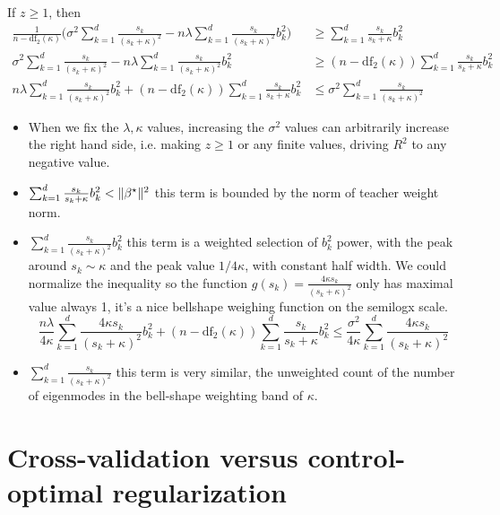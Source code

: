 If $z\geq1$, then
\begin{align*}
\frac{1}{n-\mathrm{df}_{2}(\kappa)}\Big(\sigma^{2}\sum_{k=1}^{d}\frac{s_{k}}{(s_{k}+\kappa)^{2}}-n\lambda\sum_{k=1}^{d}\frac{s_{k}}{(s_{k}+\kappa)^{2}}b_{k}^{2}\Big) & \geq\sum_{k=1}^{d}\frac{s_{k}}{s_{k}+\kappa}b_{k}^{2}\\
\sigma^{2}\sum_{k=1}^{d}\frac{s_{k}}{(s_{k}+\kappa)^{2}}-n\lambda\sum_{k=1}^{d}\frac{s_{k}}{(s_{k}+\kappa)^{2}}b_{k}^{2} & \geq(n-\mathrm{df}_{2}(\kappa))\sum_{k=1}^{d}\frac{s_{k}}{s_{k}+\kappa}b_{k}^{2}\\
n\lambda\sum_{k=1}^{d}\frac{s_{k}}{(s_{k}+\kappa)^{2}}b_{k}^{2}+(n-\mathrm{df}_{2}(\kappa))\sum_{k=1}^{d}\frac{s_{k}}{s_{k}+\kappa}b_{k}^{2} & \leq\sigma^{2}\sum_{k=1}^{d}\frac{s_{k}}{(s_{k}+\kappa)^{2}}
\end{align*}

\begin{itemize}
\item When we fix the $\lambda,\kappa$ values, increasing the $\sigma^{2}$
values can arbitrarily increase the right hand side, i.e. making $z\geq1$
or any finite values, driving $R^{2}$ to any negative value.
\item $\sum_{k=1}^{d}\frac{s_{k}}{s_{k}+\kappa}b_{k}^{2}<\|{\beta^{\star}}\|^{2}$
this term is bounded by the norm of teacher weight norm.
\item $\sum_{k=1}^{d}\frac{s_{k}}{(s_{k}+\kappa)^{2}}b_{k}^{2}$ this term
is a weighted selection of $b_{k}^{2}$ power, with the peak around
$s_{k}\sim\kappa$ and the peak value $1/4\kappa$, with constant
half width. We could normalize the inequality so the function $g(s_{k})=\frac{4\kappa s_{k}}{(s_{k}+\kappa)^{2}}$
only has maximal value always 1, it's a nice bellshape weighing function
on the semilogx scale.
\[
\frac{n\lambda}{4\kappa}\sum_{k=1}^{d}\frac{4\kappa s_{k}}{(s_{k}+\kappa)^{2}}b_{k}^{2}+(n-\mathrm{df}_{2}(\kappa))\sum_{k=1}^{d}\frac{s_{k}}{s_{k}+\kappa}b_{k}^{2}\leq\frac{\sigma^{2}}{4\kappa}\sum_{k=1}^{d}\frac{4\kappa s_{k}}{(s_{k}+\kappa)^{2}}
\]
\item $\sum_{k=1}^{d}\frac{s_{k}}{(s_{k}+\kappa)^{2}}$ this term is very
similar, the unweighted count of the number of eigenmodes in the bell-shape
weighting band of $\kappa$.
\end{itemize}



\section{Cross-validation versus control-optimal regularization}\label{sec:app-optimal-regularization}

